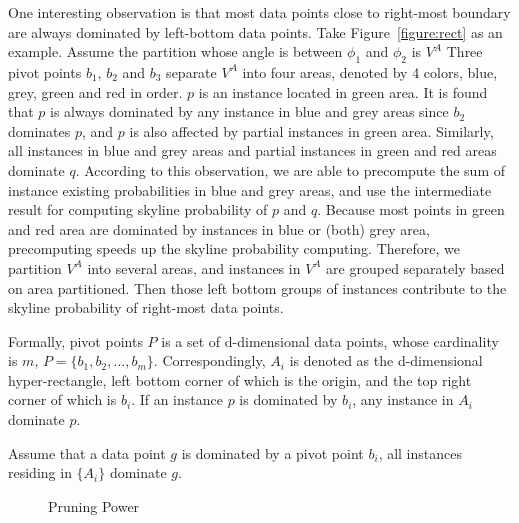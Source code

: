 One interesting observation is that most data points close to right-most boundary are always dominated by left-bottom data points. Take Figure~\ref{figure:rect} as an example. Assume the partition whose angle is between $\phi_1$ and $\phi_2$ is $V^A$ Three pivot points $b_1$, $b_2$ and $b_3$ separate $V^A$ into four areas, denoted by 4 colors, blue, grey, green and red in order. $p$ is an instance located in green area. It is found that $p$ is always dominated by any instance in blue and grey areas since $b_2$ dominates $p$, and $p$ is also affected by partial instances in green area. Similarly, all instances in blue and grey areas and partial instances in green and red areas dominate $q$. According to this observation, we are able to precompute the sum of instance existing probabilities in blue and grey areas, and use the intermediate result for computing skyline probability of $p$ and $q$. Because most points in green and red area are dominated by instances in blue or (both) grey area, precomputing speeds up the skyline probability computing. Therefore, we partition $V^A$ into several areas, and instances in $V^A$ are grouped separately based on area partitioned. Then those left bottom groups of instances contribute to the skyline probability of right-most data points.



Formally, pivot points $P$ is a set of d-dimensional data points, whose cardinality is $m$, $P = \{b_1, b_2, \dots, b_m\}$. 
Correspondingly, $A_i$ is denoted as the d-dimensional hyper-rectangle, left bottom corner of which is the origin, and the top right corner of which is $b_i$. If an instance $p$ is dominated by $b_i$, any instance in $A_i$ dominate $p$.


\begin{prop}
Assume that a data point $g$ is dominated by a pivot point $b_i$, all instances residing in $\{A_i\}$ dominate $g$.
\end{prop}

\begin{figure}[t]
\vspace{-15pt}
\centering
  \centerline{}
  \caption{Pruning Power}
  \vspace{-15pt}
  \label{figure:pruning}
\end{figure}

